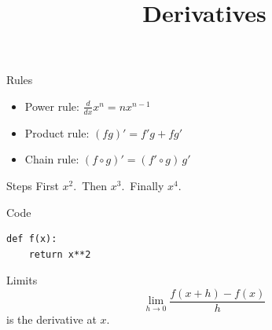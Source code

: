 \documentclass{beamer}
\title{Derivatives}
\begin{document}
\begin{frame}{Rules}
  \begin{itemize}[<+->]
    \item Power rule: $\frac{d}{dx} x^n = n x^{n-1}$
    \item Product rule: $(fg)' = f'g + fg'$
    \item Chain rule: $(f\circ g)' = (f'\circ g)\, g'$
  \end{itemize}
\end{frame}
\begin{frame}{Steps}
  First $x^2$.\pause\ Then $x^3$.\pause\ Finally $x^4$.
\end{frame}
\begin{frame}[fragile]{Code}
\begin{verbatim}
def f(x):
    return x**2
\end{verbatim}
\end{frame}
\begin{frame}{Limits}
  \[ \lim_{h\to 0} \frac{f(x+h)-f(x)}{h} \]
  \pause
  is the derivative at $x$.
\end{frame}
\end{document}
